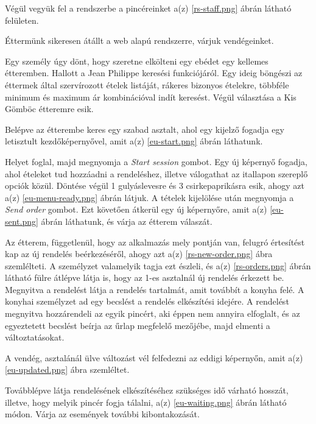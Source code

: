 Végül vegyük fel a rendszerbe a pincéreinket a(z) \ref{rs-staff.png} ábrán látható felületen.


Éttermünk sikeresen átállt a web alapú rendszerre, várjuk vendégeinket.

Egy személy úgy dönt, hogy szeretne elkölteni egy ebédet egy kellemes étteremben. Hallott a Jean Philippe keresési funkciójáról. Egy ideig böngészi az éttermek által szervírozott ételek listáját, rákeres bizonyos ételekre, többféle minimum és maximum ár kombinációval indít keresést. Végül választása a Kis Gömböc étteremre esik.


Belépve az étterembe keres egy szabad asztalt, ahol egy kijelző fogadja egy letisztult kezdőképernyővel, amit a(z) \ref{eu-start.png} ábrán láthatunk.

Helyet foglal, majd megnyomja a \emph{Start session} gombot. Egy új képernyő fogadja, ahol ételeket tud hozzáadni a rendeléshez, illetve válogathat az itallapon szereplő opciók közül. Döntése végül 1 gulyáslevesre és 3 csirkepaprikásra esik, ahogy azt a(z) \ref{eu-menu-ready.png} ábrán látjuk. A tételek kijelölése után megnyomja a \emph{Send order} gombot. Ezt követően átkerül egy új képernyőre, amit a(z) \ref{eu-sent.png} ábrán láthatunk, és várja az étterem válaszát.

Az étterem, függetlenül, hogy az alkalmazás mely pontján van, felugró értesítést kap az új rendelés beérkezéséről, ahogy azt a(z) \ref{rs-new-order.png} ábra szemlélteti. A személyzet valamelyik tagja ezt észleli, és a(z) \ref{rs-orders.png} ábrán látható fülre átlépve látja is, hogy az 1-es asztalnál új rendelés érkezett be. Megnyitva a rendelést látja a rendelés tartalmát, amit továbbít a konyha felé. A konyhai személyzet ad egy becslést a rendelés elkészítési idejére. A rendelést megnyitva hozzárendeli az egyik pincért, aki éppen nem annyira elfoglalt, és az egyeztetett becslést beírja az űrlap megfelelő mezőjébe, majd elmenti a változtatásokat. \par


A vendég, asztalánál ülve változást vél felfedezni az eddigi képernyőn, amit a(z) \ref{eu-updated.png} ábra szemléltet.

Továbblépve látja rendelésének elkészítéséhez szükséges idő várható hosszát, illetve, hogy melyik pincér fogja tálalni, a(z) \ref{eu-waiting.png} ábrán látható módon. Várja az események további kibontakozását.

